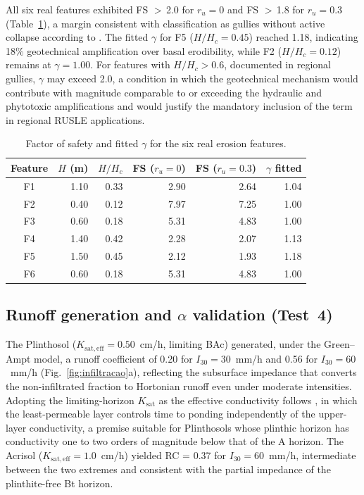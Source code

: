 \documentclass[preprint,review,12pt,authoryear]{elsarticle}
\begin{document}
All six real features exhibited FS $>$\,2.0 for $r_u = 0$ and FS $>$\,1.8 for $r_u = 0.3$ (Table~\ref{tab:fs}), a margin consistent with classification as gullies without active collapse according to \citet{poesen_2018}. The fitted $\gamma$ for F5 ($H/H_c = 0.45$) reached 1.18, indicating 18\% geotechnical amplification over basal erodibility, while F2 ($H/H_c = 0.12$) remains at $\gamma = 1.00$. For features with $H/H_c > 0.6$, documented in regional gullies, $\gamma$ may exceed 2.0, a condition in which the geotechnical mechanism would contribute with magnitude comparable to or exceeding the hydraulic and phytotoxic amplifications and would justify the mandatory inclusion of the term in regional RUSLE applications.

\begin{table}[htbp]
\centering
\caption{Factor of safety and fitted $\gamma$ for the six real erosion features.}
\label{tab:fs}
\small
\begin{tabular}{@{}c r r r r r@{}}
\toprule
Feature & $H$ (m) & $H/H_c$ & FS ($r_u = 0$) & FS ($r_u = 0.3$) & $\gamma$ fitted \\
\midrule
F1 & 1.10 & 0.33 & 2.90 & 2.64 & 1.04 \\
F2 & 0.40 & 0.12 & 7.97 & 7.25 & 1.00 \\
F3 & 0.60 & 0.18 & 5.31 & 4.83 & 1.00 \\
F4 & 1.40 & 0.42 & 2.28 & 2.07 & 1.13 \\
F5 & 1.50 & 0.45 & 2.12 & 1.93 & 1.18 \\
F6 & 0.60 & 0.18 & 5.31 & 4.83 & 1.00 \\
\bottomrule
\end{tabular}
\end{table}

\subsection{Runoff generation and $\alpha$ validation (Test~4)}

The Plinthosol ($K_{\mathrm{sat,eff}} = 0.50$~cm/h, limiting BAc) generated, under the Green--Ampt model, a runoff coefficient of 0.20 for $I_{30} = 30$~mm/h and 0.56 for $I_{30} = 60$~mm/h (Fig.~\ref{fig:infiltracao}a), reflecting the subsurface impedance that converts the non-infiltrated fraction to Hortonian runoff even under moderate intensities. Adopting the limiting-horizon $K_{\mathrm{sat}}$ as the effective conductivity follows \citet{wang_et_al_1999}, in which the least-permeable layer controls time to ponding independently of the upper-layer conductivity, a premise suitable for Plinthosols whose plinthic horizon has conductivity one to two orders of magnitude below that of the A horizon. The Acrisol ($K_{\mathrm{sat,eff}} = 1.0$~cm/h) yielded RC = 0.37 for $I_{30} = 60$~mm/h, intermediate between the two extremes and consistent with the partial impedance of the plinthite-free Bt horizon.
\end{document}
